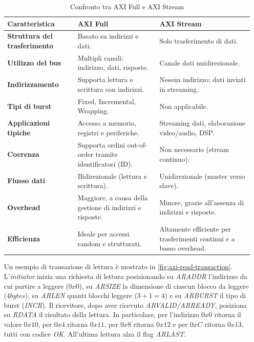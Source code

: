 \documentclass{article}
\begin{document}
\begin{table}[h!]
\centering
\renewcommand{\arraystretch}{1.2} %
\begin{tabular}{|l|p{5cm}|p{5cm}|}
\hline
\textbf{Caratteristica} & \textbf{AXI Full} & \textbf{AXI Stream} \\ \hline
\textbf{Struttura del trasferimento} & 
Basato su indirizzi e dati. & 
Solo trasferimento di dati. \\ \hline
\textbf{Utilizzo del bus} & 
Multipli canali: indirizzo, dati, risposte. & 
Canale dati unidirezionale. \\ \hline
\textbf{Indirizzamento} & 
Supporta lettura e scrittura con indirizzi. & 
Nessun indirizzo: dati inviati in streaming. \\ \hline
\textbf{Tipi di burst} & 
Fixed, Incremental, Wrapping. & 
Non applicabile. \\ \hline
\textbf{Applicazioni tipiche} & 
Accesso a memoria, registri e periferiche. & 
Streaming dati, elaborazione video/audio, DSP. \\ \hline
\textbf{Coerenza} & 
Supporta ordini out-of-order tramite identificatori (ID). & 
Non necessario (stream continuo). \\ \hline
\textbf{Flusso dati} & 
Bidirezionale (lettura e scrittura). & 
Unidirezionale (master verso slave). \\ \hline
\textbf{Overhead} & 
Maggiore, a causa della gestione di indirizzi e risposte. & 
Minore, grazie all'assenza di indirizzi e risposte. \\ \hline
\textbf{Efficienza} & 
Ideale per accessi random e strutturati. & 
Altamente efficiente per trasferimenti continui e a basso overhead. \\ \hline
\end{tabular}
\caption{Confronto tra AXI Full e AXI Stream}
\label{tab:axi-full-vs-stream}
\end{table}

Un esempio di transazione di lettura è mostrato in \cref{fig:axi-read-transaction}. L'\textit{initiator} inizia una richiesta di lettura posizionando su \textit{ARADDR} l'indirizzo da cui partire a leggere ($0x0$), su \textit{ARSIZE} la dimensione di ciascun blocco da leggere ($4 bytes$), su \textit{ARLEN} quanti blocchi leggere ($3 + 1 = 4$) e su \textit{ARBURST} il tipo di burst (\textit{INCR}). Il ricevitore, dopo aver ricevuto \textit{ARVALID/ARREADY}, posiziona su \textit{RDATA} il risultato della lettura. In particolare, per l'indirizzo $0x0$ ritorna il valore $0x10$, per $0x4$ ritorna $0x11$, per $0x8$ ritorna $0x12$ e per $0xC$ ritorna $0x13$, tutti con codice \textit{OK}. All'ultima lettura alza il flag \textit{ARLAST}.
\end{document}
